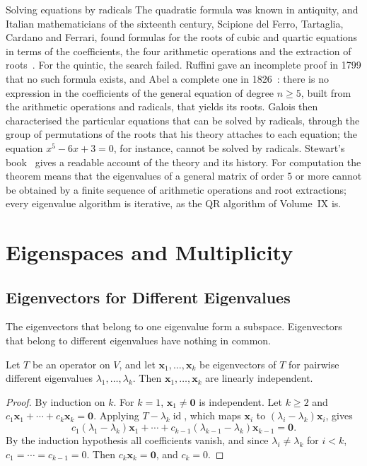 \begin{note}{Solving equations by radicals}
The quadratic formula was known in antiquity, and Italian mathematicians of the sixteenth century, Scipione del Ferro, Tartaglia, Cardano and Ferrari, found formulas for the roots of cubic and quartic equations in terms of the coefficients, the four arithmetic operations and the extraction of roots~\cite{katz2009}. For the quintic, the search failed. Ruffini gave an incomplete proof in 1799 that no such formula exists, and Abel a complete one in 1826~\cite{abel1826quintic,stewart2015galois}: there is no expression in the coefficients of the general equation of degree $n\ge5$, built from the arithmetic operations and radicals, that yields its roots. Galois then characterised the particular equations that can be solved by radicals, through the group of permutations of the roots that his theory attaches to each equation; the equation $x^5-6x+3=0$, for instance, cannot be solved by radicals. Stewart's book~\cite{stewart2015galois} gives a readable account of the theory and its history. For computation the theorem means that the eigenvalues of a general matrix of order $5$ or more cannot be obtained by a finite sequence of arithmetic operations and root extractions; every eigenvalue algorithm is iterative, as the QR algorithm of Volume~IX is.
\end{note}

\section{Eigenspaces and Multiplicity}
\label{sec:eigenspaces}

\subsection{Eigenvectors for Different Eigenvalues}

The eigenvectors that belong to one eigenvalue form a subspace. Eigenvectors that belong to different eigenvalues have nothing in common.

\begin{theorem}
\label{thm:distinct-independent}
Let $T$ be an operator on $V$, and let $\mathbf x_1,\ldots,\mathbf x_k$ be eigenvectors of $T$ for pairwise different eigenvalues $\lambda_1,\ldots,\lambda_k$. Then $\mathbf x_1,\ldots,\mathbf x_k$ are linearly independent.
\end{theorem}

\begin{proof}
By induction on $k$. For $k=1$, $\mathbf x_1\ne\mathbf 0$ is independent. Let $k\ge2$ and $c_1\mathbf x_1+\cdots+c_k\mathbf x_k=\mathbf 0$. Applying $T-\lambda_k\operatorname{id}$, which maps $\mathbf x_i$ to $(\lambda_i-\lambda_k)\mathbf x_i$, gives
\[
c_1(\lambda_1-\lambda_k)\mathbf x_1+\cdots+c_{k-1}(\lambda_{k-1}-\lambda_k)\mathbf x_{k-1}=\mathbf 0 .
\]
By the induction hypothesis all coefficients vanish, and since $\lambda_i\ne\lambda_k$ for $i<k$, $c_1=\cdots=c_{k-1}=0$. Then $c_k\mathbf x_k=\mathbf 0$, and $c_k=0$.
\end{proof}

